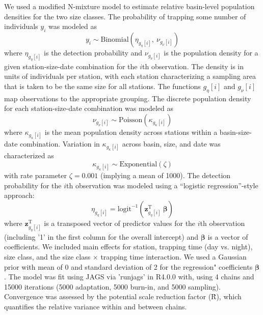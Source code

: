We used a modified N-mixture model to estimate relative basin-level population densities
for the two size classes.
The probability of trapping some number of individuals $y_i$ 
was modeled as
%
\begin{equation}
  y_i \sim \text{Binomial}\left(\eta_{g_{\eta}[i]}, ~\nu_{g_{\nu}[i]}\right)
\end{equation}
%
where $\eta_{g_{\eta}[i]}$ is the detection probability 
and $\nu_{g_{\nu}[i]}$ is the population density for a given 
station-size-date combination for the $i$th observation.
The density is in units of individuals per station, 
with each station characterizing a sampling area that is 
taken to be the same size for all stations.
The functions ${g_{\eta}[i]}$ and ${g_{\nu}[i]}$ map observations to the 
appropriate grouping. 
The discrete population density for each station-size-date combination was modeled as
%
\begin{equation}
  \nu_{g_{\nu}[i]} \sim \text{Poisson}\left(\kappa_{g_{\kappa}[i]}\right)
\end{equation}
%
where $\kappa_{g_{\kappa}[i]}$ is the mean population density across stations 
within a basin-size-date combination. 
Variation in $\kappa_{g_{\kappa}[i]}$ across basin, size, 
and date was characterized as 
%
\begin{equation}
  \kappa_{g_{\kappa}[i]} \sim 
    \text{Exponential}\left(\zeta \right)
\end{equation}
%
with rate parameter $\zeta = 0.001$ (implying a mean of 1000).
The detection probability for the $i$th observation was modeled using a 
``logistic regression''-style approach:
%
\begin{equation}
  \eta_{g_{\eta}[i]} = 
    \text{logit}^{-1}\left(\mathbf{z}_{g_{\eta}[i]}^\text{T}~{\boldsymbol\beta}\right)
\end{equation}
%
\noindent where $\mathbf{z}_{g_{\eta}[i]}^\text{T}$ is a transposed vector 
of predictor values for the $i$th observation
(including '1' in the first column for the overall intercept)
and $\boldsymbol\beta$ is a vector of coefficients. 
We included main effects for station, trapping time (day vs. night), size class,
and the size class $\times$ trapping time interaction.
We used a Gaussian prior with mean of 0 and standard deviation of 2 
for the regression" coefficients $\boldsymbol\beta$.
The model was fit using JAGS via 'runjags' in R4.0.0 with,
using 4 chains and 15000 iterations (5000 adaptation, 5000 burn-in, and 5000 sampling).
Convergence was assessed by the potential scale reduction factor (\^{R}),
which quantifies the relative variance within and between chains. 

